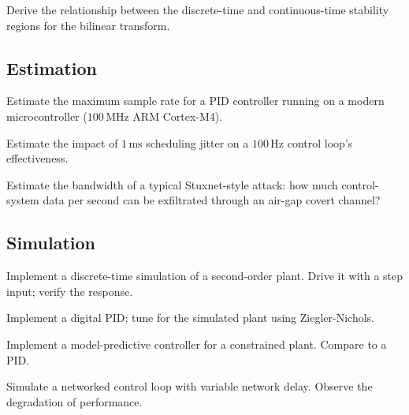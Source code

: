 \begin{exercise}
Derive the relationship between the discrete-time and continuous-time stability regions for the bilinear transform.
\end{exercise}

\subsection*{Estimation}

\begin{exercise}
Estimate the maximum sample rate for a PID controller running on a modern microcontroller ($100\,\si{\mega\hertz}$ ARM Cortex-M4).
\end{exercise}

\begin{exercise}
Estimate the impact of $1\,\si{\milli\second}$ scheduling jitter on a $100\,\si{\hertz}$ control loop's effectiveness.
\end{exercise}

\begin{exercise}
Estimate the bandwidth of a typical Stuxnet-style attack: how much control-system data per second can be exfiltrated through an air-gap covert channel?
\end{exercise}

\subsection*{Simulation}

\begin{exercise}
Implement a discrete-time simulation of a second-order plant. Drive it with a step input; verify the response.
\end{exercise}

\begin{exercise}
Implement a digital PID; tune for the simulated plant using Ziegler-Nichols.
\end{exercise}

\begin{exercise}
Implement a model-predictive controller for a constrained plant. Compare to a PID.
\end{exercise}

\begin{exercise}
Simulate a networked control loop with variable network delay. Observe the degradation of performance.
\end{exercise}

